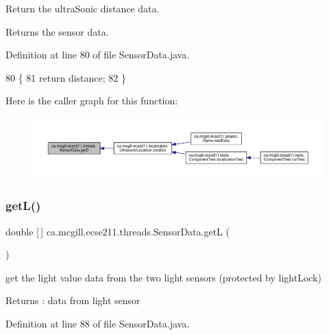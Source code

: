 Return the ultra\+Sonic distance data.

\begin{DoxyReturn}{Returns}
the sensor data. 
\end{DoxyReturn}


Definition at line 80 of file Sensor\+Data.\+java.


\begin{DoxyCode}
80                        \{
81     \textcolor{keywordflow}{return} distance;
82   \}
\end{DoxyCode}
Here is the caller graph for this function\+:
\nopagebreak
\begin{figure}[H]
\begin{center}
\leavevmode
\includegraphics[width=350pt]{classca_1_1mcgill_1_1ecse211_1_1threads_1_1_sensor_data_a46cc30522719018a80f89624e0ce458f_icgraph}
\end{center}
\end{figure}
\mbox{\label{classca_1_1mcgill_1_1ecse211_1_1threads_1_1_sensor_data_a39eec50582f0e4bcff8a4669c48e1609}} 
\subsubsection{\texorpdfstring{get\+L()}{getL()}}
{\footnotesize\ttfamily double \mbox{[}$\,$\mbox{]} ca.\+mcgill.\+ecse211.\+threads.\+Sensor\+Data.\+getL (\begin{DoxyParamCaption}{ }\end{DoxyParamCaption})}

get the light value data from the two light sensors (protected by light\+Lock) \begin{DoxyReturn}{Returns}
\+: data from light sensor 
\end{DoxyReturn}


Definition at line 88 of file Sensor\+Data.\+java.


